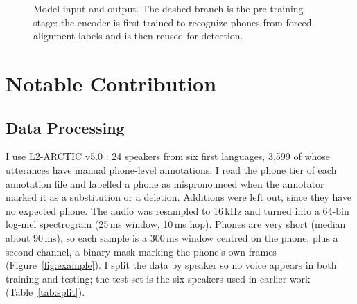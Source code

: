 \documentclass[final]{article}
\begin{document}
\begin{figure}[!h]
  \centering
  \caption{Model input and output. The dashed branch is the pre-training stage: the encoder is first trained to
  recognize phones from forced-alignment labels and is then reused for detection.}
  \label{fig:pipeline}
\end{figure}

\section*{Notable Contribution}
\subsection*{Data Processing}
I use L2-ARCTIC v5.0 \cite{zhao2018l2arctic}: 24 speakers from six first languages, 3,599 of whose utterances have
manual phone-level annotations. I read the phone tier of each annotation file and labelled a phone as mispronounced
when the annotator marked it as a substitution or a deletion. Additions were left out, since they have no expected
phone. The audio was resampled to 16\,kHz and turned into a 64-bin log-mel spectrogram (25\,ms window, 10\,ms hop).
Phones are very short (median about 90\,ms), so each sample is a 300\,ms window centred on the phone, plus a second
channel, a binary mask marking the phone's own frames (Figure~\ref{fig:example}). I split the data by speaker so no
voice appears in both training and testing; the test set is the six speakers used in earlier work
\cite{peng2021study} (Table~\ref{tab:split}).
\end{document}
